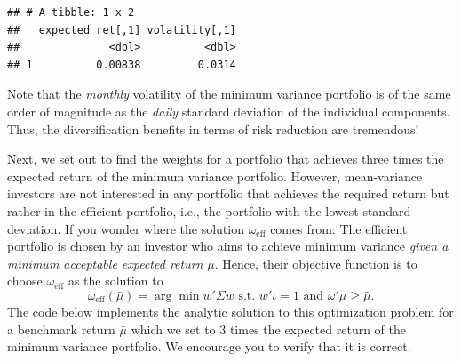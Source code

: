 \documentclass[
]{book}
\begin{document}
\begin{verbatim}
## # A tibble: 1 x 2
##   expected_ret[,1] volatility[,1]
##              <dbl>          <dbl>
## 1          0.00838         0.0314
\end{verbatim}

Note that the \emph{monthly} volatility of the minimum variance portfolio is of the same order of magnitude as the \emph{daily} standard deviation of the individual components. Thus, the diversification benefits in terms of risk reduction are tremendous!

Next, we set out to find the weights for a portfolio that achieves three times the expected return of the minimum variance portfolio. However, mean-variance investors are not interested in any portfolio that achieves the required return but rather in the efficient portfolio, i.e., the portfolio with the lowest standard deviation.
If you wonder where the solution \(\omega_\text{eff}\) comes from: The efficient portfolio is chosen by an investor who aims to achieve minimum variance \emph{given a minimum acceptable expected return} \(\bar{\mu}\). Hence, their objective function is to choose \(\omega_\text{eff}\) as the solution to
\[\omega_\text{eff}(\bar{\mu}) = \arg\min w'\Sigma w \text{ s.t. } w'\iota = 1 \text{ and } \omega'\mu \geq \bar{\mu}.\]
The code below implements the analytic solution to this optimization problem for a benchmark return \(\bar\mu\) which we set to 3 times the expected return of the minimum variance portfolio. We encourage you to verify that it is correct.
\end{document}

